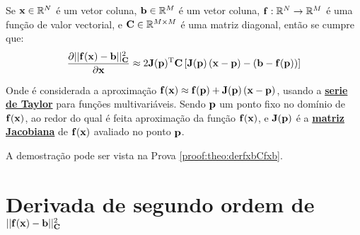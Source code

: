 \begin{theorem}\label{theo:derfxbCfxb}
Se 
$\VECTOR{x}\in \mathbb{R}^N$ é um vetor coluna, 
$\VECTOR{b}\in \mathbb{R}^M$ é um vetor coluna,  
$\VECTOR{f}: \mathbb{R}^{N}\rightarrow \mathbb{R}^{M}$ é uma função de valor vectorial, e
$\MATRIX{C} \in \mathbb{R}^{M\times M}$ é uma matriz diagonal, 
então se cumpre que:
\begin{equation}
\frac{\partial ||\VECTOR{f}(\VECTOR{x})-\VECTOR{b}||_{\MATRIX{C}}^2}{\partial \VECTOR{x}} \approx
2 \MATRIX{J}(\VECTOR{p})^{\transpose}\MATRIX{C}\left[\MATRIX{J}(\VECTOR{p})\left(\VECTOR{x} - \VECTOR{p}\right)-\left(\VECTOR{b}-\VECTOR{f}(\VECTOR{p})\right)\right]
\end{equation}

Onde é considerada a aproximação
$\VECTOR{f}(\VECTOR{x})\approx \VECTOR{f}(\VECTOR{p})+\MATRIX{J}(\VECTOR{p})\left(\VECTOR{x}-\VECTOR{p}\right)$,
usando a \hyperref[def:taylor]{\textbf{serie de Taylor}} para funções multivariáveis. Sendo $\VECTOR{p}$ um ponto fixo no domínio de $\VECTOR{f}(\VECTOR{x})$,  ao redor do qual é feita  aproximação
da função $\VECTOR{f}(\VECTOR{x})$,
e $\MATRIX{J}(\VECTOR{p})$ é a \hyperref[def:jacobian]{\textbf{matriz Jacobiana}} de $\VECTOR{f}(\VECTOR{x})$ avaliado no ponto $\VECTOR{p}$.

A demostração pode ser vista na Prova \ref{proof:theo:derfxbCfxb}.
\end{theorem}


\section{Derivada de segundo ordem de $||\VECTOR{f}(\VECTOR{x})-\VECTOR{b}||_{\MATRIX{C}}^2$ 
}




